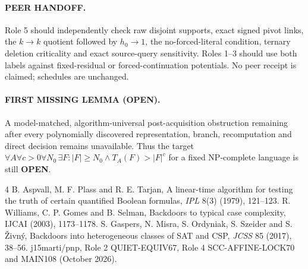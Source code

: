 \documentclass[11pt]{article}
\begin{document}
\paragraph{PEER HANDOFF.}
Role 5 should independently check raw disjoint supports, exact signed
pivot links, the $k\to k$ quotient followed by $h_0\to1$,
the no-forced-literal condition, ternary deletion criticality
and exact source-query sensitivity. Roles 1--3 should use both
labels against fixed-residual or forced-continuation potentials.
No peer receipt is claimed; schedules are unchanged.
\paragraph{FIRST MISSING LEMMA (OPEN).}
A model-matched, algorithm-universal post-acquisition obstruction
remaining after every polynomially discovered representation,
branch, recomputation and direct decision remains unavailable.
Thus the target
$\forall A\forall c>0\forall N_0\,\exists F:
|F|\ge N_0\land T_A(F)>|F|^c$
for a fixed NP-complete language is still \textbf{OPEN}.

\begin{thebibliography}{4}
 B. Aspvall, M. F. Plass and R. E. Tarjan,
A linear-time algorithm for testing the truth of certain quantified
Boolean formulas, \emph{IPL} 8(3) (1979), 121--123.
 R. Williams, C. P. Gomes and B. Selman,
Backdoors to typical case complexity, IJCAI (2003), 1173--1178.
 S. Gaspers, N. Misra, S. Ordyniak,
S. Szeider and S. \v{Z}ivn\'y, Backdoors into heterogeneous
classes of SAT and CSP, \emph{JCSS} 85 (2017), 38--56.
 j15marti/pnp, Role 2 QUIET-EQUIV67,
Role 4 SCC-AFFINE-LOCK70 and MAIN108 (October 2026).
\end{thebibliography}
\end{document}
